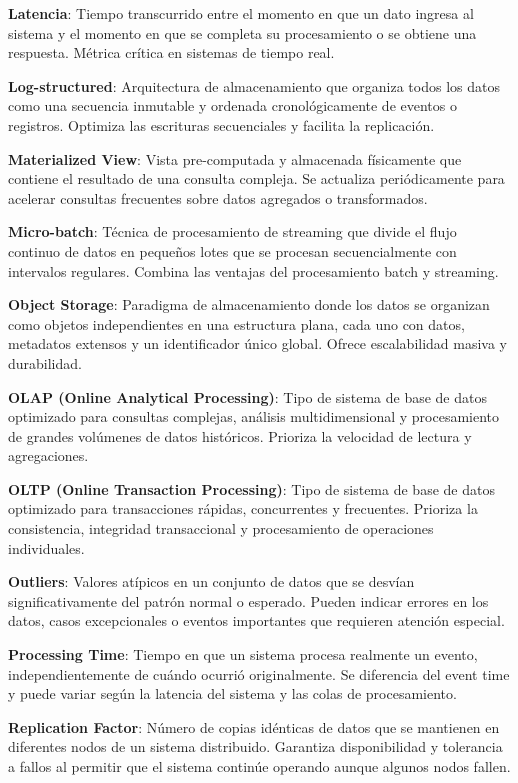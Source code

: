 \textbf{Latencia}: Tiempo transcurrido entre el momento en que un dato ingresa al sistema y el momento en que se completa su procesamiento o se obtiene una respuesta. Métrica crítica en sistemas de tiempo real.

\textbf{Log-structured}: Arquitectura de almacenamiento que organiza todos los datos como una secuencia inmutable y ordenada cronológicamente de eventos o registros. Optimiza las escrituras secuenciales y facilita la replicación.

\textbf{Materialized View}: Vista pre-computada y almacenada físicamente que contiene el resultado de una consulta compleja. Se actualiza periódicamente para acelerar consultas frecuentes sobre datos agregados o transformados.

\textbf{Micro-batch}: Técnica de procesamiento de streaming que divide el flujo continuo de datos en pequeños lotes que se procesan secuencialmente con intervalos regulares. Combina las ventajas del procesamiento batch y streaming.

\textbf{Object Storage}: Paradigma de almacenamiento donde los datos se organizan como objetos independientes en una estructura plana, cada uno con datos, metadatos extensos y un identificador único global. Ofrece escalabilidad masiva y durabilidad.

\textbf{OLAP (Online Analytical Processing)}: Tipo de sistema de base de datos optimizado para consultas complejas, análisis multidimensional y procesamiento de grandes volúmenes de datos históricos. Prioriza la velocidad de lectura y agregaciones.

\textbf{OLTP (Online Transaction Processing)}: Tipo de sistema de base de datos optimizado para transacciones rápidas, concurrentes y frecuentes. Prioriza la consistencia, integridad transaccional y procesamiento de operaciones individuales.

\textbf{Outliers}: Valores atípicos en un conjunto de datos que se desvían significativamente del patrón normal o esperado. Pueden indicar errores en los datos, casos excepcionales o eventos importantes que requieren atención especial.

\textbf{Processing Time}: Tiempo en que un sistema procesa realmente un evento, independientemente de cuándo ocurrió originalmente. Se diferencia del event time y puede variar según la latencia del sistema y las colas de procesamiento.

\newpage

\textbf{Replication Factor}: Número de copias idénticas de datos que se mantienen en diferentes nodos de un sistema distribuido. Garantiza disponibilidad y tolerancia a fallos al permitir que el sistema continúe operando aunque algunos nodos fallen.

